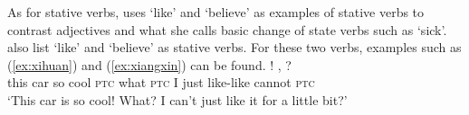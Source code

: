 \documentclass[fleqn,twoside]{article}
\begin{document}
\begin{enumerate}
As for stative verbs, \citet[Sec. 3.3]{Tham2013} uses  `like' and  `believe' as examples of stative verbs
to contrast adjectives
and what she calls basic change of state verbs such as  `sick'.
\citet[680]{PeckEtAl2013} also list  `like' and  `believe' as stative verbs.
For these two verbs, examples such as (\ref{ex:xihuan}) and (\ref{ex:xiangxin}) can be found.
\ea\label{ex:xihuan}%
\gll {}    !  ,     ?\\
this car so cool \textsc{ptc} what \textsc{ptc} I just like-like cannot \textsc{ptc}\\
\glt `This car is so cool! What? I can't just like it for a little bit?'


\end{enumerate}
\end{document}
